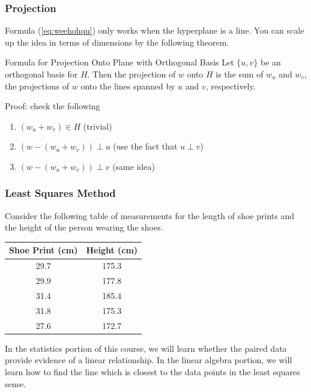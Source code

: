 \documentclass[xcolor=dvipsnames]{beamer}
\begin{document}
\begin{frame}
  \frametitle{Projection}
  Formula (\ref{eq:weehohqu}) only works when the hyperplane is a
  line. You can scale up the idea in terms of dimensions by the
  following theorem.
  \begin{block}{Formula for Projection Onto Plane with Orthogonal
      Basis}
    Let $\{u,v\}$ be an orthogonal basis for $H$. Then the projection
    of $w$ onto $H$ is the sum of $w_{u}$ and $w_{v}$, the projections
    of $w$ onto the lines spanned by $u$ and $v$, respectively.
  \end{block}
  Proof: check the following
  \begin{enumerate}
  \item $(w_{u}+w_{v})\in{}H$ (trivial)
  \item $(w-(w_{u}+w_{v}))\perp{}u$ (use the fact that $u\perp{}v$)
  \item $(w-(w_{u}+w_{v}))\perp{}v$ (same idea)
  \end{enumerate}
\end{frame}

\begin{frame}
  \frametitle{Least Squares Method}
  Consider the following table of measurements for the length of shoe
  prints and the height of the person wearing the shoes.

  \medskip
  
  \begin{tabular}{|c|c|}\hline
    Shoe Print (cm) & Height (cm) \\ \hline
    29.7 & 175.3 \\ \hline
    29.9 & 177.8 \\ \hline
    31.4 & 185.4 \\ \hline
    31.8 & 175.3 \\ \hline
    27.6 & 172.7 \\ \hline
  \end{tabular}

  \medskip
  
  In the statistics portion of this course, we will learn whether the
  paired data provide evidence of a linear relationship. In the linear
  algebra portion, we will learn how to find the line which is closest
  to the data points in the least squares sense.
\end{frame}
\end{document}
